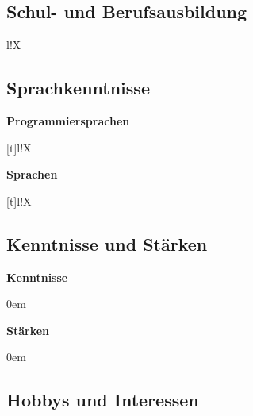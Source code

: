 ﻿\documentclass[
	a4paper,
	fontsize=12
]{scrartcl}
\begin{document}
\subsection{Schul- und Berufsausbildung}
\begin{tabularx}{\textwidth}{l!{\color{RoyalBlue}\vrule}X}
	\CVeducation
\end{tabularx}

\subsection{Sprachkenntnisse}
\begin{minipage}[t]{0.5\textwidth}
	\textbf{Programmiersprachen\medskip}\\
	\begin{tabularx}{\textwidth}[t]{l!{\color{RoyalBlue}\vrule}X}
		\CVProgLangs
	\end{tabularx}
\end{minipage}
\begin{minipage}[t]{0.5\textwidth}
	\textbf{Sprachen\medskip}\\
	\begin{tabularx}{\textwidth}[t]{l!{\color{RoyalBlue}\vrule}X}
		\CVNatLangs
	\end{tabularx}
\end{minipage}

\subsection{Kenntnisse und Stärken}
\begin{minipage}[t]{0.5\textwidth}
	\textbf{Kenntnisse}
	\begin{flushleft}
	\begin{itemize}\itemsep0em
		\CVKnowledge
	\end{itemize}
	\end{flushleft}
\end{minipage}
\BlueVLine{ }
\begin{minipage}[t]{0.5\textwidth}
	\textbf{Stärken}
	\begin{flushleft}
	\begin{itemize}\itemsep0em
		\CVStrength
	\end{itemize}
	\end{flushleft}
\end{minipage}

\subsection{Hobbys und Interessen}
	\CVHobbiesInterests
\newpage
\end{document}
